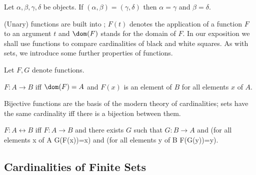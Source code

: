 \begin{forthel}
    \begin{axiom}
        Let $\alpha, \beta, \gamma, \delta$ be objects.
        If $(\alpha, \beta) = (\gamma, \delta)$
        then $\alpha = \gamma$ and $\beta = \delta$.
    \end{axiom}
\end{forthel}

(Unary) functions are built into \Naproche{}; $F(t)$ denotes the
application of a function $F$ to an argument $t$ and
$\dom(F)$ stands for the domain of $F$. In our exposition we shall
use functions to compare cardinalities of black and white squares. As with
sets, we introduce some further properties of functions.

\begin{forthel}
    Let $F,G$ denote functions.

    \begin{definition}
        $F : A \to B$ iff $\dom(F) = A$ and
        $F(x)$ is an element of $B$ for all elements $x$ of $A$.
    \end{definition}
\end{forthel}

Bijective functions are the basis of the modern theory of cardinalities; sets
have the same cardinality iff there is a bijection between them.

\begin{forthel}
    \begin{definition}
        $F : A \leftrightarrow B$ iff $F : A \to B$ and there exists $G$ such that
        $G : B \to A$ and
        (for all elements x of A G(F(x))=x) and
        (for all elements y of B F(G(y))=y).
    \end{definition}
\end{forthel}


\subsection{Cardinalities of Finite Sets}

